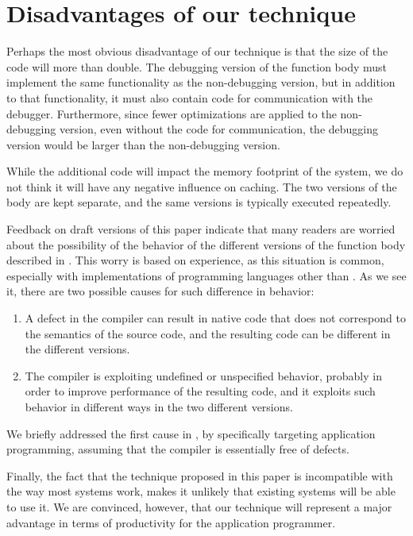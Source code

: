\section{Disadvantages of our technique}

Perhaps the most obvious disadvantage of our technique is that the
size of the code will more than double.  The debugging version of the
function body must implement the same functionality as the
non-debugging version, but in addition to that functionality, it must
also contain code for communication with the debugger.  Furthermore,
since fewer optimizations are applied to the non-debugging version,
even without the code for communication, the debugging version would
be larger than the non-debugging version.

While the additional code will impact the memory footprint of the
system, we do not think it will have any negative influence on
caching.  The two versions of the body are kept separate, and the same
versions is typically executed repeatedly.

Feedback on draft versions of this paper indicate that many readers
are worried about the possibility of the behavior of the different
versions of the function body described in
.  This worry is based on experience,
as this situation is common, especially with implementations of
programming languages other than \commonlisp{}.  As we see it, there
are two possible causes for such difference in behavior:

\begin{enumerate}
\item A defect in the compiler can result in native code that does not
  correspond to the semantics of the source code, and the resulting
  code can be different in the different versions.
\item The compiler is exploiting undefined or unspecified behavior,
  probably in order to improve performance of the resulting code, and
  it exploits such behavior in different ways in the two different
  versions.
\end{enumerate}

We briefly addressed the first cause in , by
specifically targeting application programming, assuming that the
compiler is essentially free of defects.

Finally, the fact that the technique proposed in this paper is
incompatible with the way most \commonlisp{} systems work, makes it
unlikely that existing systems will be able to use it.  We are
convinced, however, that our technique will represent a major
advantage in terms of productivity for the application programmer.
